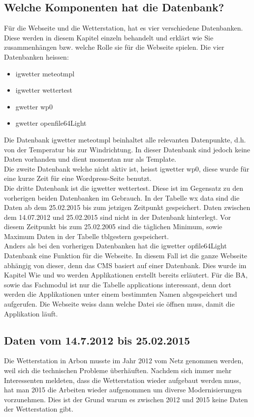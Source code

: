 \documentclass[a4paper,ngerman, 11pt, pagesize]{report}
\begin{document}
\subsection{Welche Komponenten hat die Datenbank?}
Für die Webseite und die Wetterstation, hat es vier verschiedene Datenbanken. Diese werden in diesem Kapitel einzeln behandelt und erklärt wie Sie zusammenhängen bzw. welche Rolle sie für die Webseite spielen. Die vier Datenbanken heissen:
\begin{itemize}  
\item igwetter meteotmpl
\item igwetter wettertest
\item gwetter wp0
\item gwetter openfile64Light
\end{itemize}

Die Datenbank igwetter meteotmpl beinhaltet alle relevanten Datenpunkte, d.h. von der Temperatur bis zur Windrichtung. In dieser Datenbank sind jedoch keine Daten vorhanden und dient momentan nur als Template.\\
Die zweite Datenbank welche nicht aktiv ist, heisst igwetter wp0, diese wurde für eine kurze Zeit für eine Wordpress-Seite benutzt.\\
Die dritte Datenbank ist die igwetter wettertest. Diese ist im Gegensatz zu den vorherigen beiden Datenbanken im Gebrauch. In der Tabelle wx data sind die Daten ab dem 25.02.2015 bis zum jetzigen Zeitpunkt gespeichert. Daten zwischen dem 14.07.2012 und 25.02.2015 sind nicht in der Datenbank hinterlegt. Vor diesem Zeitpunkt bis zum 25.02.2005 sind die täglichen Minimum, sowie Maximum Daten in der Tabelle tblgestern gespeichert.\\
Anders als bei den vorherigen Datenbanken hat die igwetter opfile64Light Datenbank eine Funktion für die Webseite. In diesem Fall ist die ganze Webseite abhängig von dieser, denn das CMS basiert auf einer Datenbank. Dies wurde im Kapitel Wie und wo werden Applikationen erstellt bereits erläutert. Für die BA, sowie das Fachmodul ist nur die Tabelle applications interessant, denn dort werden die Applikationen unter einem bestimmten Namen abgespeichert und aufgerufen. Die Webseite weiss dann welche Datei sie öffnen muss, damit die Applikation läuft.\\


\subsection{Daten vom 14.7.2012 bis 25.02.2015}
Die Wetterstation in Arbon musste im Jahr 2012 vom Netz genommen werden, weil sich die technischen Probleme überhäuften. Nachdem sich immer mehr Interessenten meldeten, dass die Wetterstation wieder aufgebaut werden muss, hat man 2015 die Arbeiten wieder aufgenommen um diverse Modernisierungen vorzunehmen. Dies ist der Grund warum es zwischen 2012 und 2015 keine Daten der Wetterstation gibt. ~\cite{Felix:ErweiterteHorizonte}
\end{document}
